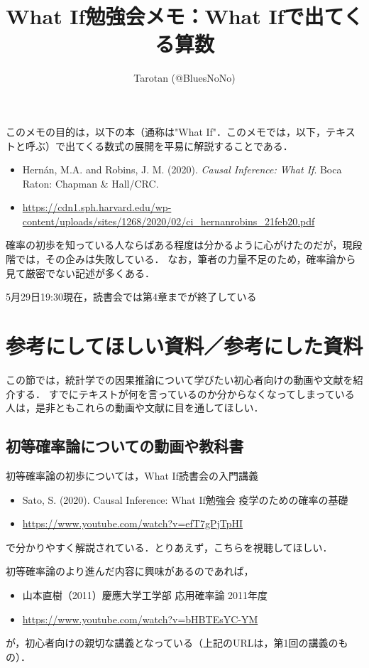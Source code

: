\documentclass[12pt]{jsarticle}
\title{What If勉強会メモ：What Ifで出てくる算数}
\author{Tarotan (@BluesNoNo)}
\begin{document}
\maketitle

このメモの目的は，以下の本（通称は"What If"．このメモでは，以下，テキストと呼ぶ）で出てくる数式の展開を平易に解説することである．

\begin{itemize}
\item[] Hern\'an, M.A. and Robins, J. M. (2020). {\it Causal Inference: What If}. Boca Raton: Chapman \& Hall/CRC.
\item[] \url{https://cdn1.sph.harvard.edu/wp-content/uploads/sites/1268/2020/02/ci_hernanrobins_21feb20.pdf}
\end{itemize}

確率の初歩を知っている人ならばある程度は分かるように心がけたのだが，現段階では，その企みは失敗している．
なお，筆者の力量不足のため，確率論から見て厳密でない記述が多くある．

5月29日19:30現在，読書会では第4章までが終了している

\section{参考にしてほしい資料／参考にした資料}
この節では，統計学での因果推論について学びたい初心者向けの動画や文献を紹介する．
すでにテキストが何を言っているのか分からなくなってしまっている人は，是非ともこれらの動画や文献に目を通してほしい．


\subsection{初等確率論についての動画や教科書}
初等確率論の初歩については，What If読書会の入門講義
\begin{itemize}
\item[] Sato, S. (2020). Causal Inference: What If勉強会 疫学のための確率の基礎
\item[] \url{https://www.youtube.com/watch?v=efT7gPjTpHI}
\end{itemize}
で分かりやすく解説されている．とりあえず，こちらを視聴してほしい．


初等確率論のより進んだ内容に興味があるのであれば，
\begin{itemize}
\item[] 山本直樹（2011）慶應大学工学部 応用確率論 2011年度
\item[] \url{https://www.youtube.com/watch?v=bHBTEsYC-YM}
\end{itemize}
が，初心者向けの親切な講義となっている（上記のURLは，第1回の講義のもの）．
\end{document}
